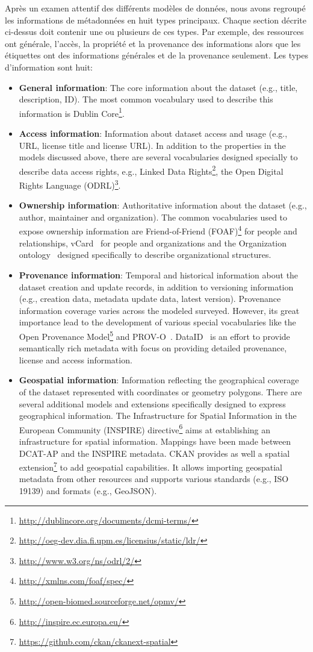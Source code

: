 \documentclass[a4paper,11pt,twoside]{ThesisStyle}
\begin{document}
Après un examen attentif des différents modèles de données, nous avons regroupé les informations de métadonnées en huit types principaux. Chaque section décrite ci-dessus doit contenir une ou plusieurs de ces types. Par exemple, des ressources ont générale, l'accès, la propriété et la provenance des informations alors que les étiquettes ont des informations générales et de la provenance seulement. Les types d'information sont huit:
\begin{itemize}
 \item \textbf{General information}: The core information about the dataset (e.g., title, description, ID). The most common vocabulary used to describe this information is Dublin Core\footnote{\url{http://dublincore.org/documents/dcmi-terms/}}.
 \item \textbf{Access information}: Information about dataset access and usage (e.g., URL, license title and license URL). In addition to the properties in the models discussed above, there are several vocabularies designed specially to describe data access rights, e.g., Linked Data Rights\footnote{\url{http://oeg-dev.dia.fi.upm.es/licensius/static/ldr/}}, the Open Digital Rights Language (ODRL)\footnote{\url{http://www.w3.org/ns/odrl/2/}}.
 \item \textbf{Ownership information}: Authoritative information about the dataset (e.g., author, maintainer and organization). The common vocabularies used to expose ownership information are Friend-of-Friend (FOAF)\footnote{\url{http://xmlns.com/foaf/spec/}} for people and relationships, vCard~\cite{Iannella:W3C:14} for people and organizations and the Organization ontology~\cite{Reynolds:W3C:14} designed specifically to describe organizational structures.
 \item \textbf{Provenance information}: Temporal and historical information about the dataset creation and update records, in addition to versioning information (e.g., creation data, metadata update data, latest version). Provenance information coverage varies across the modeled surveyed. However, its great importance lead to the development of various special vocabularies like the Open Provenance Model\footnote{\url{http://open-biomed.sourceforge.net/opmv/}} and PROV-O~\cite{Lebo:W3C:13}. DataID~\cite{Brummer::ICSS:14} is an effort to provide semantically rich metadata with focus on providing detailed provenance, license and access information.
 \item \textbf{Geospatial information}: Information reflecting the geographical coverage of the dataset represented with coordinates or geometry polygons. There are several additional models and extensions specifically designed to express geographical information. The Infrastructure for Spatial Information in the European Community (INSPIRE) directive\footnote{\url{http://inspire.ec.europa.eu/}} aims at establishing an infrastructure for spatial information. Mappings have been made between DCAT-AP and the INSPIRE metadata. CKAN provides as well a spatial extension\footnote{\url{https://github.com/ckan/ckanext-spatial}} to add geospatial capabilities. It allows importing geospatial metadata from other resources and supports various standards (e.g., ISO 19139) and formats (e.g., GeoJSON).

\end{itemize}
\end{document}
